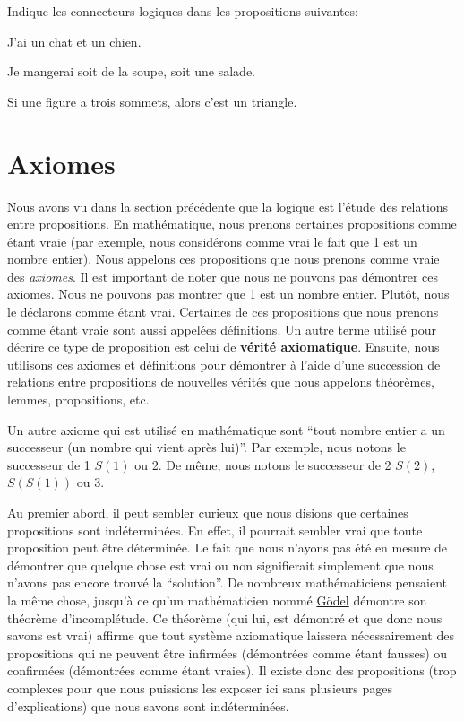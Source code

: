 \begin{exercice}
    Indique les connecteurs logiques dans les propositions suivantes:
    \begin{exerciceenumnoeq}
        \item J'ai un chat et un chien.
        \item Je mangerai soit de la soupe, soit une salade.
        \item Si une figure a trois sommets, alors c'est un triangle.
    \end{exerciceenumnoeq}
\end{exercice}

\section{Axiomes}

Nous avons vu dans la section précédente que la logique est l'étude des relations entre propositions. En mathématique, nous prenons certaines propositions comme étant vraie (par exemple, nous considérons comme vrai le fait que 1 est un nombre entier). Nous appelons ces propositions que nous prenons comme vraie des {\em axiomes}. Il est important de noter que nous ne pouvons pas démontrer ces axiomes. Nous ne pouvons pas montrer que 1 est un nombre entier. Plutôt, nous le déclarons comme étant vrai. Certaines de ces propositions que nous prenons comme étant vraie sont aussi appelées définitions. Un autre terme utilisé pour décrire ce type de proposition est celui de \textbf{vérité axiomatique}. Ensuite, nous utilisons ces axiomes et définitions pour démontrer à l'aide d'une succession de relations entre propositions de nouvelles vérités que nous appelons théorèmes, lemmes, propositions, etc.

\begin{exemple}\label{concepts_de_base:axiomes_ex}
    Un autre axiome qui est utilisé en mathématique sont ``tout nombre entier a un successeur (un nombre qui vient après lui)''. Par exemple, nous notons le successeur de 1 $S(1)$ ou 2. De même, nous notons le successeur de 2 $S(2)$, $S(S(1))$ ou 3.
\end{exemple}

\begin{pourallerplusloin}
    Au premier abord, il peut sembler curieux que nous disions que certaines propositions sont indéterminées. En effet, il pourrait sembler vrai que toute proposition peut être déterminée. Le fait que nous n'ayons pas été en mesure de démontrer que quelque chose est vrai ou non signifierait simplement que nous n'avons pas encore trouvé la ``solution''. De nombreux mathématiciens pensaient la même chose, jusqu'à ce qu'un mathématicien nommé \href{https://fr.wikipedia.org/wiki/Kurt_Gödel}{Gödel} démontre son théorème d'incomplétude. Ce théorème (qui lui, est démontré et que donc nous savons est vrai) affirme que tout système axiomatique laissera nécessairement des propositions qui ne peuvent être infirmées (démontrées comme étant fausses) ou confirmées (démontrées comme étant vraies). Il existe donc des propositions (trop complexes pour que nous puissions les exposer ici sans plusieurs pages d'explications) que nous savons sont indéterminées.
\end{pourallerplusloin}

